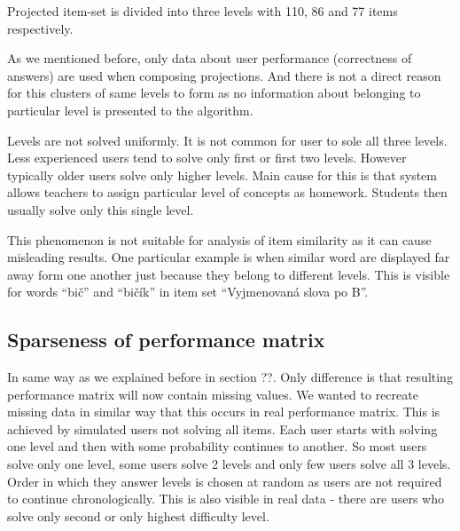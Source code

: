 \documentclass[
  digital, %
  table,   %
  nolof,     %
  nolot,     %
  nocover
]{fithesis3}
\begin{document}
Projected item-set is divided into three levels with 110, 86 and 77 items respectively.

As we mentioned before, only data about user performance (correctness of
answers) are used when composing projections. And there is not a direct
reason for this clusters of same levels to form as no information about
belonging to particular level is presented to the algorithm.


Levels are not solved uniformly. It is not common for user to sole all
three levels. Less experienced users tend to solve only first or first
two levels. However typically older users solve only higher levels. Main
cause for this is that system allows teachers to assign particular level
of concepts as homework. Students then usually solve only this single
level.



This phenomenon is not suitable for analysis of item similarity as it
can cause misleading results. One particular example is when similar
word are displayed far away form one another just because they belong to
different levels. This is visible for words ``bič'' and ``bičík'' in
item set ``Vyjmenovaná slova po B''.

\subsection{Sparseness of performance
matrix}\label{sparseness-of-performance-matrix}



In same way as we explained before in section ??. Only difference is that resulting performance matrix will now contain missing values. We wanted to recreate missing data in similar way that this occurs in real performance matrix. This is achieved by simulated users not solving all items. Each user starts with solving one level and then with some probability continues to another. So most users solve only one level, some users solve 2 levels and only few users solve all 3 levels. Order in which they answer levels is chosen at random as users are not required to continue chronologically. This is also visible in real data - there are users who solve only second or only highest difficulty level.
\end{document}
